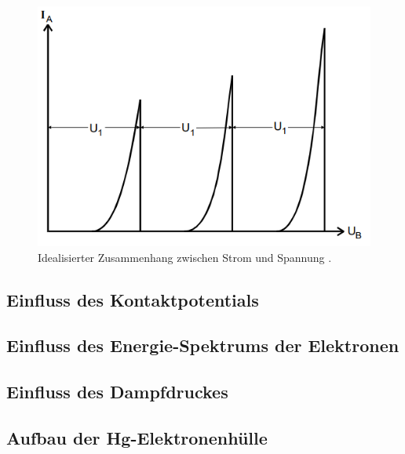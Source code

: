 \begin{figure}[H]
    \centering
    \includegraphics[scale=1]{content/Diskret.png}
    \caption{Idealisierter Zusammenhang zwischen Strom und Spannung \cite{sample}.}
    \label{fig:Diskret}
\end{figure}

\subsection{Einfluss des Kontaktpotentials}
\subsection{Einfluss des Energie-Spektrums der Elektronen}
\subsection{Einfluss des Dampfdruckes}
\subsection{Aufbau der Hg-Elektronenhülle}
\cite{sample}
